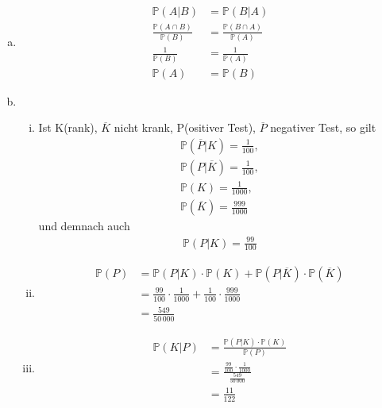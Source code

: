\documentclass{article}
\renewcommand{\P}{\mathbb{P}}
\begin{document}
    \section{}
    \subsection{}
    \begin{enumerate}[a)]
        \item
            \begin{align*}
                \P(A|B)&=\P(B|A)\\
                \frac{\P(A\cap B)}{\P(B)}&=
                \frac{\P(B\cap A)}{\P(A)}\\
                \frac{1}{\P(B)}&=\frac{1}{\P(A)}\\
                \P(A)&=\P(B)
            \end{align*}
        \item
            \begin{enumerate}[(i)]
                \item
                    Ist K(rank), $\overline{K}$ nicht krank,
                    P(ositiver Test), $\overline{P}$
                    negativer Test, so gilt
                    \begin{align*}
                        \P(\overline{P}|K)=\frac{1}{100},\\
                        \P(P|\overline{K})=\frac{1}{100},\\
                        \P(K)=\frac{1}{1000},\\
                        \P(\overline{K})=\frac{999}{1000}
                    \end{align*}
                    und demnach auch
                    \begin{align*}
                        \P(P|K)=\frac{99}{100}
                    \end{align*}
                \item
                    \begin{align*}
                        \P(P)
                        &=\P(P|K)\cdot\P(K)
                        +\P(P|\overline{K})\cdot\P(\overline{K})\\
                        &=\frac{99}{100}\cdot\frac{1}{1000}
                        +\frac{1}{100}\cdot\frac{999}{1000}\\
                        &=\frac{549}{50\,000}
                    \end{align*}
                \item
                    \begin{align*}
                        \P(K|P)&=
                        \frac{\P(P|K)\cdot\P(K)}{\P(P)}\\
                        &=\frac{
                            \frac{99}{100}\cdot\frac{1}{1000}
                        } {\frac{549}{50\,000}}\\
                        &=\frac{11}{122}
                    \end{align*}
            \end{enumerate}
    \end{enumerate}
\end{document}
